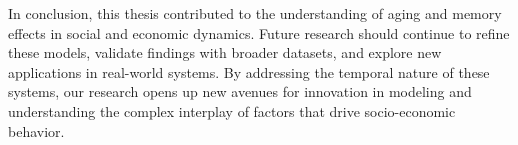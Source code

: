 In conclusion, this thesis contributed to the understanding of aging and memory effects in social and economic dynamics. Future research should continue to refine these models, validate findings with broader datasets, and explore new applications in real-world systems. By addressing the temporal nature of these systems, our research opens up new avenues for innovation in modeling and understanding the complex interplay of factors that drive socio-economic behavior.
